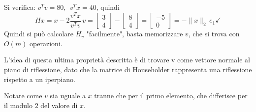 \documentclass[12pt,a4paper,]{report}
\begin{document}
\begin{itemize}
\[    \]
    Si verifica: $v^Tv = 80$, $\;v^Tx = 40$, quindi
    \[
    Hx = x - 2\frac{v^Tx}{v^Tv}\,v = \begin{bmatrix}3\\[-10pt]4\end{bmatrix} - \begin{bmatrix}8\\[-10pt]4\end{bmatrix} = \begin{bmatrix}-5\\[-10pt]0\end{bmatrix} = -\|x\|_2\,e_1 \checkmark
    \]
    Quindi si può calcolare $H_v$ "facilmente",
    basta memorizzare $v$,
    che si trova con $O(m)$ operazioni.
    \begin{nota}
        L'idea di questa ultima proprietà descritta è di trovare v come vettore normale al piano di riflessione, dato che la matrice di Householder rappresenta una riflessione rispetto a un iperpiano. 
    \end{nota}
\end{itemize}
\begin{nota}
    [Importante]
    Notare come $v$ sia uguale a $x$ tranne che per il primo elemento, che differisce per il modulo $2$ del valore di $x$.
\end{nota}
\end{document}
